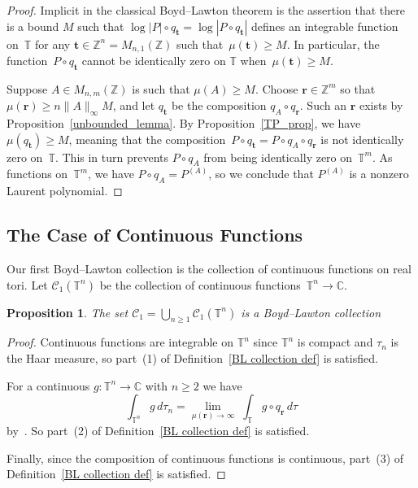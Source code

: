 \documentclass[12pt]{amsart}
\theoremstyle{plain}
\newtheorem{proposition}[theorem]{Proposition}
\theoremstyle{definition}
\theoremstyle{remark}
\numberwithin{theorem}{section}
\numberwithin{equation}{section} %
\newcommand{\bZ}{{\mathbb{Z}}}
\newcommand{\bC}{{\mathbb{C}}}
\newcommand{\mc}{\mathcal}
\newcommand{\mb}{\mathbf}
\newcommand{\torus}{{\mathbb{T}}}
\begin{document}
\begin{proof}
Implicit in the classical Boyd--Lawton theorem is the assertion that
there is a bound $M$ such that 
$\log | P| \circ q_{\mb t} = \log| P \circ q_{\mb t} |$ defines an integrable function on~$\torus$
for any $\mb t \in \bZ^n = M_{n,1}(\bZ)$
such that~$\mu({\mb t}) \ge M$. 
In particular, the function~$P \circ q_{\mb t}$
cannot be identically zero on $\torus$ when~$\mu({\mb t}) \ge M$.

Suppose $A \in M_{n, m}(\bZ)$ is such that $\mu(A) \ge M$.
Choose $\mb r \in \bZ^m$ so that $\mu\left(\mb r\right) \ge n \|A\|_\infty M$, and
let $q_{\mb t}$ be the composition $q_A \circ q_{\mb r}$.
Such an $\mb r$ exists by Proposition~\ref{unbounded_lemma}.
By Proposition~\ref{TP_prop}, we have $\mu(q_{\mb t}) \ge M$, meaning
that the composition~$P \circ q_{\mb t} = P \circ q_A \circ q_{\mb r}$ is not
identically zero on~$\torus$. This in turn prevents $P \circ q_A$ from being
identically zero on~$\torus^m$. 
As functions on~$\torus^m$, we have $P \circ q_A = P^{(A)}$, so we conclude
that $P^{(A)}$ is a nonzero Laurent polynomial.
\end{proof}


\subsection{The Case of Continuous Functions}

Our first Boyd--Lawton collection is the collection of continuous functions on real tori. Let $\mc C_1 (\torus^n)$ be the collection of continuous functions~$\torus^n \to \bC$.

\begin{proposition} \label{prop: C_1}
The set  $\mc C_1 = \bigcup_{n \ge 1} \mc C_1 (\torus^n)$ is a Boyd--Lawton collection
\end{proposition}

\begin{proof}
Continuous functions are integrable on $\torus^n$ since $\torus^n$ is compact and $\tau_n$ is the Haar measure, so part~(1) of Definition~\ref{BL collection def} is satisfied.

For a continuous $g \colon \torus^n \to \bC$ with $n \ge 2$ we have
$$
\int_{\torus^n}  g \, d\tau_n= \lim_{\mu(\mb r)\to \infty}\;  \int_\torus g \circ q_{\mb r} \, d \tau
$$
by~\cite[Lemma~1]{boyd1981}. 
So part~(2) of Definition~\ref{BL collection def} is satisfied.

Finally, since the composition of continuous functions is continuous, 
part~(3) of Definition~\ref{BL collection def} is satisfied.
\end{proof}
\end{document}
